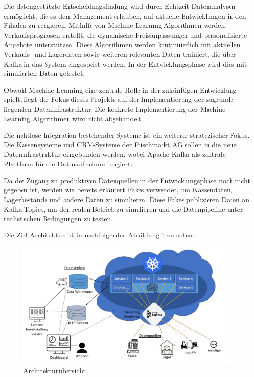 \documentclass[%
pdftex,
oneside,			%
11pt,				%
parskip=half,		%
headheight = 12pt,	%
headsepline,		%
footsepline,		%
footheight = 16pt,	%
abstracton,		%
DIV=calc,		%
BCOR=8mm,		%
headinclude=false,	%
footinclude=false,	%
listof=totoc,		%
toc=bibliography,	%
]{scrreprt}	%
\begin{document}

    Die datengestützte Entscheidungsfindung wird durch Echtzeit-Datenanalysen ermöglicht, die es dem Management erlauben, auf aktuelle Entwicklungen in den Filialen zu reagieren.
    Mithilfe von Machine Learning-Algorithmen werden Verkaufsprognosen erstellt, die dynamische Preisanpassungen und personalisierte Angebote unterstützen.
    Diese Algorithmen werden kontinuierlich mit aktuellen Verkaufs- und Lagerdaten sowie weiteren relevanten Daten trainiert, die über Kafka in das System eingespeist werden.
    In der Entwicklungsphase wird dies mit simulierten Daten getestet.

    Obwohl Machine Learning eine zentrale Rolle in der zukünftigen Entwicklung spielt, liegt der Fokus dieses Projekts auf der Implementierung der zugrunde liegenden Dateninfrastruktur.
    Die konkrete Implementierung der Machine Learning Algorithmen wird nicht abgehandelt.


    Die nahtlose Integration bestehender Systeme ist ein weiterer strategischer Fokus.
    Die Kassensysteme und CRM-Systeme der Frischmarkt AG sollen in die neue Dateninfrastruktur eingebunden werden, wobei Apache Kafka als zentrale Plattform für die Datenaufnahme fungiert.

    Da der Zugang zu produktiven Datenquellen in der Entwicklungsphase noch nicht gegeben ist, werden wie bereits erläutert Fakes verwendet, um Kassendaten, Lagerbestände und andere Daten zu simulieren.
    Diese Fakes publizieren Daten an Kafka Topics, um den realen Betrieb zu simulieren und die Datenpipeline unter realistischen Bedingungen zu testen.

    Die Ziel-Architektur ist in nachfolgender Abbildung \ref{fig:architekturentwurf} zu sehen.

    \begin{figure}[H]
        \centering
        \includegraphics[width=1\textwidth]{assets/architekturentwurf.jpg}
        \caption{Architekturübersicht}
        \label{fig:architekturentwurf}
    \end{figure}
\end{document}
